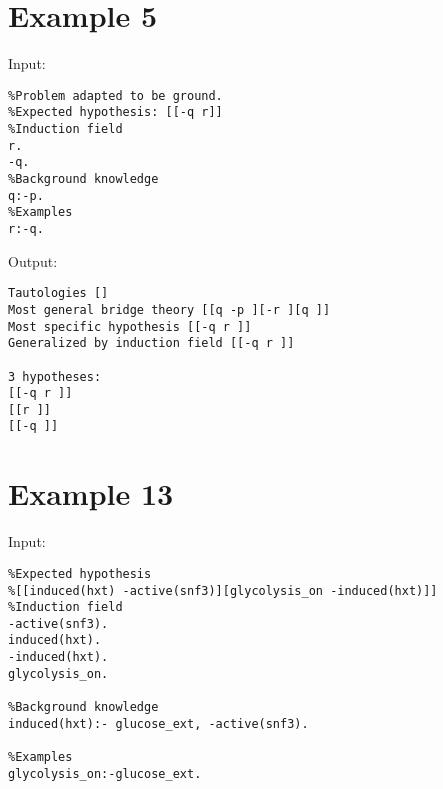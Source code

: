 \section{Example 5}
Input:
\begin{lstlisting}
%Problem adapted to be ground.
%Expected hypothesis: [[-q r]]
%Induction field
r.
-q.
%Background knowledge
q:-p.
%Examples
r:-q.
\end{lstlisting}

Output:
\begin{lstlisting}
Tautologies []
Most general bridge theory [[q -p ][-r ][q ]]
Most specific hypothesis [[-q r ]]
Generalized by induction field [[-q r ]]

3 hypotheses:
[[-q r ]]
[[r ]]
[[-q ]]
\end{lstlisting}

\section{Example 13}
Input:
\begin{lstlisting}
%Expected hypothesis
%[[induced(hxt) -active(snf3)][glycolysis_on -induced(hxt)]]
%Induction field
-active(snf3).
induced(hxt).
-induced(hxt).
glycolysis_on.

%Background knowledge
induced(hxt):- glucose_ext, -active(snf3).

%Examples
glycolysis_on:-glucose_ext.
\end{lstlisting}

